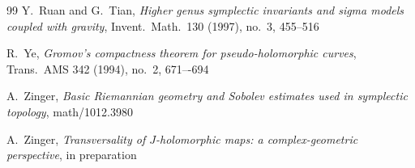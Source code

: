 \documentclass[11pt]{article}
\numberwithin{equation}{section}
\theoremstyle{definition}
\begin{document}
\begin{thebibliography}{99}
 Y.~Ruan and G.~Tian,
{\it Higher genus symplectic invariants and sigma models coupled with gravity},
Invent.~Math.~130 (1997), no.~3, 455--516

 R.~Ye, 
{\it Gromov's compactness theorem for pseudo-holomorphic curves},
Trans.~AMS 342 (1994), no.~2, 671–-694

 A.~Zinger, {\it Basic Riemannian geometry and Sobolev estimates
used in symplectic topology}, math/1012.3980

 A.~Zinger, {\it Transversality of $J$-holomorphic maps:
a complex-geometric perspective}, in preparation

\end{thebibliography}
\end{document}

